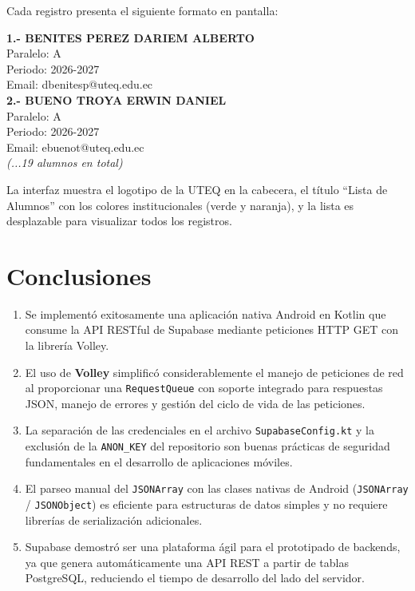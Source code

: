\documentclass[12pt]{article}
\begin{document}
Cada registro presenta el siguiente formato en pantalla:

\begin{tcolorbox}[colback=backcolour, colframe=uteqorange, title=Salida en pantalla de la aplicación]
\textbf{1.- BENITES PEREZ DARIEM ALBERTO}\\
Paralelo: A\\
Periodo: 2026-2027\\
Email: dbenitesp@uteq.edu.ec\\[0.4em]
\textbf{2.- BUENO TROYA ERWIN DANIEL}\\
Paralelo: A\\
Periodo: 2026-2027\\
Email: ebuenot@uteq.edu.ec\\[0.4em]
\textit{(...19 alumnos en total)}
\end{tcolorbox}

La interfaz muestra el logotipo de la UTEQ en la cabecera, el título ``Lista de Alumnos'' con los colores institucionales (verde y naranja), y la lista es desplazable para visualizar todos los registros.

\section{Conclusiones}

\begin{enumerate}[leftmargin=1.5cm]
    \item Se implementó exitosamente una aplicación nativa Android en Kotlin que consume la API RESTful de Supabase mediante peticiones HTTP GET con la librería Volley.
    \item El uso de \textbf{Volley} simplificó considerablemente el manejo de peticiones de red al proporcionar una \texttt{RequestQueue} con soporte integrado para respuestas JSON, manejo de errores y gestión del ciclo de vida de las peticiones.
    \item La separación de las credenciales en el archivo \texttt{SupabaseConfig.kt} y la exclusión de la \texttt{ANON\_KEY} del repositorio son buenas prácticas de seguridad fundamentales en el desarrollo de aplicaciones móviles.
    \item El parseo manual del \texttt{JSONArray} con las clases nativas de Android (\texttt{JSONArray} / \texttt{JSONObject}) es eficiente para estructuras de datos simples y no requiere librerías de serialización adicionales.
    \item Supabase demostró ser una plataforma ágil para el prototipado de backends, ya que genera automáticamente una API REST a partir de tablas PostgreSQL, reduciendo el tiempo de desarrollo del lado del servidor.
\end{enumerate}
\end{document}
